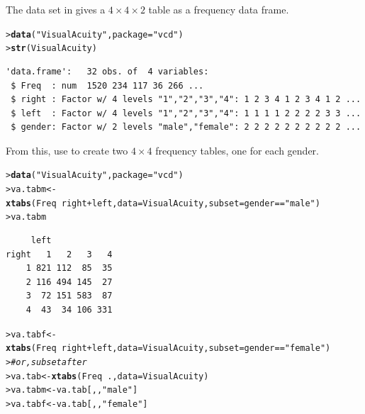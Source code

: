 \documentclass[11pt]{report}\usepackage[]{graphicx}\usepackage[]{color}
\makeatletter
\newcommand{\hlstr}[1]{\textcolor[rgb]{0.192,0.494,0.8}{#1}}%
\newcommand{\hlcom}[1]{\textcolor[rgb]{0.678,0.584,0.686}{\textit{#1}}}%
\newcommand{\hlopt}[1]{\textcolor[rgb]{0,0,0}{#1}}%
\newcommand{\hlstd}[1]{\textcolor[rgb]{0.345,0.345,0.345}{#1}}%
\newcommand{\hlkwb}[1]{\textcolor[rgb]{0.69,0.353,0.396}{#1}}%
\newcommand{\hlkwc}[1]{\textcolor[rgb]{0.333,0.667,0.333}{#1}}%
\newcommand{\hlkwd}[1]{\textcolor[rgb]{0.737,0.353,0.396}{\textbf{#1}}}%
\newenvironment{kframe}{%
 \def\at@end@of@kframe{}%
 \ifinner\ifhmode%
  \def\at@end@of@kframe{\end{minipage}}%
  \begin{minipage}{\columnwidth}%
 \fi\fi%
 \def\FrameCommand##1{\hskip\@totalleftmargin \hskip-\fboxsep
 \colorbox{shadecolor}{##1}\hskip-\fboxsep
     \hskip-\linewidth \hskip-\@totalleftmargin \hskip\columnwidth}%
 \MakeFramed {\advance\hsize-\width
   \@totalleftmargin\z@ \linewidth\hsize
   \@setminipage}}%
 {\par\unskip\endMakeFramed%
 \at@end@of@kframe}
\newenvironment{knitrout}{}{} %
\renewenvironment{knitrout}{\small\renewcommand{\baselinestretch}{.85}}{} %
\makeatother
\begin{document}
\begin{Exercises}
\exercise The data set  in  gives a $4 \times 4 \times 2$
table as a frequency data frame.
\begin{knitrout}
\color{fgcolor}\begin{kframe}
\begin{alltt}
\hlstd{> }\hlkwd{data}\hlstd{(}\hlstr{"VisualAcuity"}\hlstd{,} \hlkwc{package} \hlstd{=} \hlstr{"vcd"}\hlstd{)}
\hlstd{> }\hlkwd{str}\hlstd{(VisualAcuity)}
\end{alltt}
\begin{verbatim}
'data.frame':	32 obs. of  4 variables:
 $ Freq  : num  1520 234 117 36 266 ...
 $ right : Factor w/ 4 levels "1","2","3","4": 1 2 3 4 1 2 3 4 1 2 ...
 $ left  : Factor w/ 4 levels "1","2","3","4": 1 1 1 1 2 2 2 2 3 3 ...
 $ gender: Factor w/ 2 levels "male","female": 2 2 2 2 2 2 2 2 2 2 ...
\end{verbatim}
\end{kframe}
\end{knitrout}
  \begin{enumerate*}
    \item From this, use  to create two $4\times 4$ frequency tables, one for
each gender.
    \begin{ans}
\begin{knitrout}
\color{fgcolor}\begin{kframe}
\begin{alltt}
\hlstd{> }\hlkwd{data}\hlstd{(}\hlstr{"VisualAcuity"}\hlstd{,} \hlkwc{package}\hlstd{=}\hlstr{"vcd"}\hlstd{)}
\hlstd{> }\hlstd{va.tabm} \hlkwb{<-} \hlkwd{xtabs}\hlstd{(Freq} \hlopt{~} \hlstd{right}\hlopt{+}\hlstd{left,} \hlkwc{data} \hlstd{= VisualAcuity,} \hlkwc{subset}\hlstd{=gender}\hlopt{==}\hlstr{"male"}\hlstd{)}
\hlstd{> }\hlstd{va.tabm}
\end{alltt}
\begin{verbatim}
     left
right   1   2   3   4
    1 821 112  85  35
    2 116 494 145  27
    3  72 151 583  87
    4  43  34 106 331
\end{verbatim}
\begin{alltt}
\hlstd{> }\hlstd{va.tabf} \hlkwb{<-} \hlkwd{xtabs}\hlstd{(Freq} \hlopt{~} \hlstd{right}\hlopt{+}\hlstd{left,} \hlkwc{data} \hlstd{= VisualAcuity,} \hlkwc{subset}\hlstd{=gender}\hlopt{==}\hlstr{"female"}\hlstd{)}
\hlstd{> }\hlcom{# or, subset after}
\hlstd{> }\hlstd{va.tab} \hlkwb{<-} \hlkwd{xtabs}\hlstd{(Freq} \hlopt{~} \hlstd{.,} \hlkwc{data} \hlstd{= VisualAcuity)}
\hlstd{> }\hlstd{va.tabm} \hlkwb{<-} \hlstd{va.tab[,,}\hlstr{"male"}\hlstd{]}
\hlstd{> }\hlstd{va.tabf} \hlkwb{<-} \hlstd{va.tab[,,}\hlstr{"female"}\hlstd{]}
\end{alltt}
\end{kframe}
\end{knitrout}
    \end{ans}


\end{enumerate*}
\end{Exercises}
\end{document}
